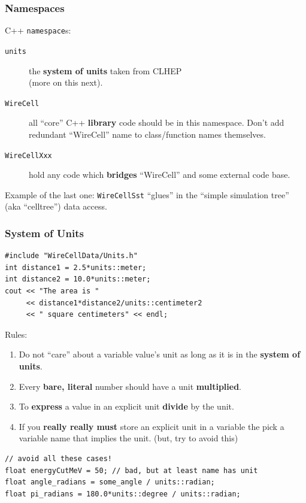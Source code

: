 \documentclass[xcolor=dvipsnames]{beamer}
\begin{document}
\begin{frame}
  \frametitle{Namespaces}

  C++ \texttt{namespace}s:
  \begin{description}
  \item[\texttt{units}]  the \textbf{system of units} taken from CLHEP \\
    (more on this next).
  \item[\texttt{WireCell}] all ``core'' C++ \textbf{library} code
    should be in this namespace.
    Don't add redundant ``WireCell'' name to class/function names
    themselves.
  \item[\texttt{WireCellXxx}] hold any code which \textbf{bridges}
    ``WireCell'' and some external code base.
  \end{description}

  Example of the last one: \texttt{WireCellSst} ``glues'' in the
  ``simple simulation tree'' (aka ``celltree'') data access.

\end{frame}

\begin{frame}[fragile]
  \frametitle{System of Units}

  \begin{lstlisting}
#include "WireCellData/Units.h"
int distance1 = 2.5*units::meter;
int distance2 = 10.0*units::meter;
cout << "The area is " 
     << distance1*distance2/units::centimeter2
     << " square centimeters" << endl;
  \end{lstlisting}
  Rules:
  \begin{enumerate}
  \item Do not ``care'' about a variable value's unit as long as it is
    in the \textbf{system of units}.
  \item Every \textbf{bare, literal} number should have a unit \textbf{multiplied}.
  \item To \textbf{express} a value in an explicit unit \textbf{divide} by the unit.
  \item If you \textbf{really really must} store an explicit unit in a
    variable the pick a variable name that implies the unit.
    (but, try to avoid this)
  \end{enumerate}
  \begin{lstlisting}
// avoid all these cases!
float energyCutMeV = 50; // bad, but at least name has unit
float angle_radians = some_angle / units::radian;
float pi_radians = 180.0*units::degree / units::radian;
\end{lstlisting}

\end{frame}
\end{document}
